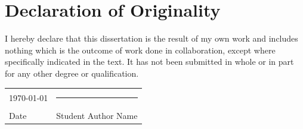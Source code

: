 \chapter*{Declaration of Originality}
I hereby declare that this dissertation is the result of my own work and includes nothing which is the outcome of work done in collaboration, except where specifically indicated in the text. It has not been submitted in whole or in part for any other degree or qualification.

\vspace{2cm}
\noindent
\begin{tabular*}{\textwidth}{@{\extracolsep{\fill}}lr}
    \today & \rule{5cm}{0.5pt} \\
    Date & Student Author Name
\end{tabular*}
